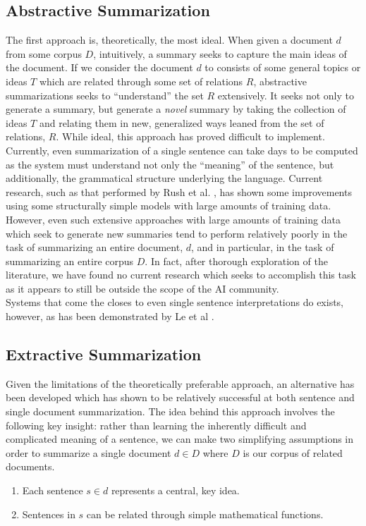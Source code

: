 \documentclass[10pt]{article}
\begin{document}
\subsection{Abstractive Summarization}
The first approach is, theoretically, the most ideal. When given a document $d$ from some corpus $D$, intuitively, a summary seeks to capture the main ideas of the document. If we consider the document $d$ to consists of some general topics or ideas $T$ which are related through some set of relations $R$, abstractive summarizations seeks to ``understand'' the set $R$ extensively. It seeks not only to generate a summary, but generate a \textit{novel} summary by taking the collection of ideas $T$ and relating them in new, generalized ways leaned from the set of relations, $R$. While ideal, this approach has proved difficult to implement. \\

Currently, even summarization of a single sentence can take days to be computed as the system must understand not only the ``meaning'' of the sentence, but additionally, the grammatical structure underlying the language. Current research, such as that performed by Rush et al. \cite{rush_article}, has shown some improvements using some structurally simple models with large amounts of training data. However, even such extensive approaches with large amounts of training data which seek to generate new summaries tend to perform relatively poorly in the task of summarizing an entire document, $d$, and in particular, in the task of summarizing an entire corpus $D$. In fact, after thorough exploration of the literature, we have found no current research which seeks to accomplish this task as it appears to still be outside the scope of the AI community. \\

Systems that come the closes to even single sentence interpretations do exists, however, as has been demonstrated by  Le et al \cite{distributed_sentences}.

\subsection{Extractive Summarization}
Given the limitations of the theoretically preferable approach, an alternative has been developed which has shown to be relatively successful at both sentence  \cite{sentence_summary} and single document summarization. The idea behind this approach involves the following key insight: rather than learning the inherently difficult and complicated meaning of a sentence, we can make two simplifying assumptions in order to summarize a single document $d \in D$ where $D$ is our corpus of related documents.
\begin{enumerate}
\item Each sentence $s \in d$ represents a central, key idea.
\item Sentences in $s$ can be related through simple mathematical functions.
\end{enumerate}
\end{document}

